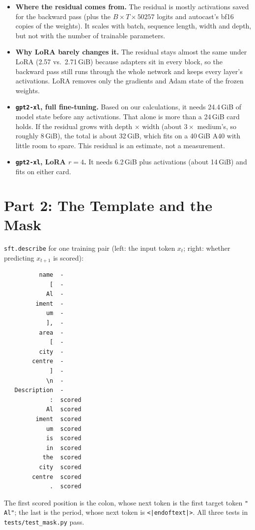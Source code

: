 \documentclass[10pt]{article}
\begin{document}
\begin{itemize}
\item \textbf{Where the residual comes from.} The residual is mostly
  activations saved for the backward pass (plus the
  $B \times T \times 50257$ logits and autocast's bf16 copies of the
  weights). It scales with batch, sequence length, width and depth, but
  not with the number of trainable parameters.
\item \textbf{Why LoRA barely changes it.} The residual stays almost the
  same under LoRA (2.57 vs.\ 2.71\,GiB) because adapters sit in every
  block, so the backward pass still runs through the whole network and
  keeps every layer's activations. LoRA removes only the gradients and
  Adam state of the frozen weights.
\item \textbf{\texttt{gpt2-xl}, full fine-tuning.} Based on our calculations,
  it needs 24.4\,GiB of model state before any activations. That alone
  is more than a 24\,GiB card holds. If the residual grows with
  depth $\times$ width (about $3\times$ medium's, so roughly 8\,GiB),
  the total is about 32\,GiB, which fits on a 40\,GiB A40 with little
  room to spare. This residual is an estimate, not a measurement.
\item \textbf{\texttt{gpt2-xl}, LoRA $r=4$.} It needs 6.2\,GiB plus
  activations (about 14\,GiB) and fits on either card.
\end{itemize}

\section*{Part 2: The Template and the Mask}

\texttt{sft.describe} for one training pair (left: the input token
$x_t$; right: whether predicting $x_{t+1}$ is scored):

\begin{verbatim}
          name  -
             [  -
            Al  -
         iment  -
            um  -
            ],  -
          area  -
             [  -
          city  -
        centre  -
             ]  -
            \n  -
   Description  -
             :  scored
            Al  scored
         iment  scored
            um  scored
            is  scored
            in  scored
           the  scored
          city  scored
        centre  scored
             .  scored
\end{verbatim}

The first scored position is the colon, whose next token is the first
target token \texttt{" Al"}; the last is the period, whose next token is
\texttt{<|endoftext|>}. All three tests in \texttt{tests/test\_mask.py}
pass.
\end{document}
